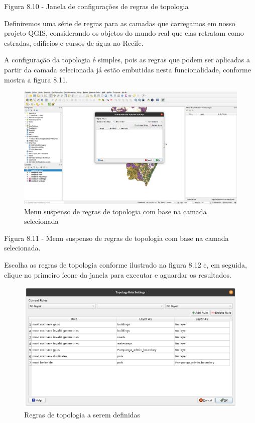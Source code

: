 \documentclass[
]{book}
\begin{document}
Figura 8.10 - Janela de configurações de regras de topologia

Definiremos uma série de regras para as camadas que carregamos em nosso projeto QGIS, considerando os objetos do mundo real que elas retratam como estradas, edifícios e cursos de água no Recife.

A configuração da topologia é simples, pois as regras que podem ser aplicadas a partir da camada selecionada já estão embutidas nesta funcionalidade, conforme mostra a figura 8.11.

\begin{figure}
\centering
\includegraphics{media/modulo8/fig811.png}
\caption{Menu suspenso de regras de topologia com base na camada selecionada}
\end{figure}

Figura 8.11 - Menu suspenso de regras de topologia com base na camada selecionada.

Escolha as regras de topologia conforme ilustrado na figura 8.12 e, em seguida, clique no primeiro ícone da janela para executar e aguardar os resultados.

\begin{figure}
\centering
\includegraphics{media/modulo8/fig812.png}
\caption{Regras de topologia a serem definidas}
\end{figure}
\end{document}

